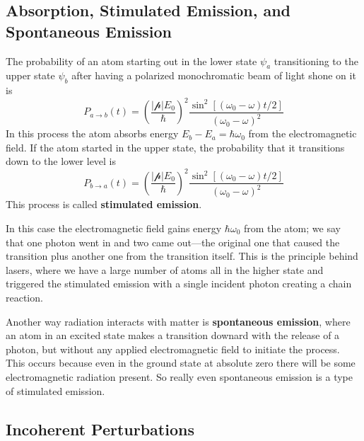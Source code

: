 \documentclass[12pt, a4paper, oneside, openright, titlepage]{book}
\begin{document}
\subsection{Absorption, Stimulated Emission, and Spontaneous Emission}

The probability of an atom starting out in the lower state $\psi_a$ transitioning to the upper state $\psi_b$ after having a polarized monochromatic beam of light shone on it is $$P_{a\rightarrow b}(t) = \left(\frac{|\mathcal{p}|E_0}{\hbar}\right)^2\frac{\sin^2[(\omega_0-\omega)t/2]}{(\omega_0-\omega)^2}$$
In this process the atom absorbs energy $E_b-E_a = \hbar\omega_0$ from the electromagnetic field. If the atom started in the upper state, the probability that it transitions down to the lower level is $$P_{b\rightarrow a}(t)=\left(\frac{|\mathcal{p}|E_0}{\hbar}\right)^2\frac{\sin^2[(\omega_0-\omega)t/2]}{(\omega_0-\omega)^2}$$
This process is called \textbf{stimulated emission}.

In this case the electromagnetic field gains energy $\hbar\omega_0$ from the atom; we say that one photon went in and two came out---the original one that caused the transition plus another one from the transition itself. This is the principle behind lasers, where we have a large number of atoms all in the higher state and triggered the stimulated emission with a single incident photon creating a chain reaction.

Another way radiation interacts with matter is \textbf{spontaneous emission}, where an atom in an excited state makes a transition downard with the release of a photon, but without any applied electromagnetic field to initiate the process. This occurs because even in the ground state at absolute zero there will be some electromagnetic radiation present. So really even spontaneous emission is a type of stimulated emission.

\subsection{Incoherent Perturbations}
\end{document}
